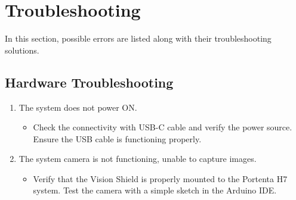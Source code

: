 %
%

\chapter{Troubleshooting}

In this section, possible errors are listed along with their troubleshooting solutions.

\section{Hardware Troubleshooting}

\begin{enumerate}
	\item The system does not power ON. 
	\begin{itemize}
		\item Check the connectivity with USB-C cable and verify the power source. Ensure the USB cable is functioning properly.
	\end{itemize}
	\item The system camera is not functioning, unable to capture images.
	\begin{itemize}
		\item Verify that the Vision Shield is properly mounted to the Portenta H7 system. Test the camera with a simple sketch in the Arduino IDE.
	\end{itemize}
\end{enumerate}

